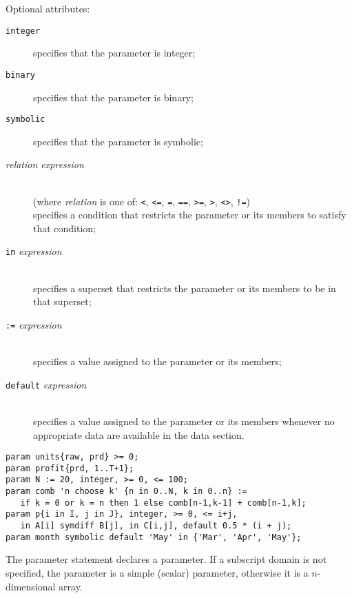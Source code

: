 \documentclass[10pt]{article}
\begin{document}
\noindent Optional attributes:

\begin{description}
\item[{\tt integer}\hspace*{18.5pt}] specifies that the parameter is
integer;
\item[{\tt binary}\hspace*{24pt}] specifies that the parameter is
binary;
\item[{\tt symbolic}\hspace*{13.5pt}] specifies that the parameter is
symbolic;
\item[{\it relation expression}]\hspace*{0pt}\\
(where {\it relation} is one of: {\tt<}, {\tt<=}, {\tt=}, {\tt==},
{\tt>=}, {\tt>}, {\tt<>}, {\tt!=})\\
specifies a condition that restricts the parameter or its members to
satisfy that condition;
\item[{\tt in} {\it expression}]\hspace*{0pt}\\
specifies a superset that restricts the parameter or its members to be
in that superset;
\item[{\tt:=} {\it expression}]\hspace*{0pt}\\
specifies a value assigned to the parameter or its members;
\item[{\tt default} {\it expression}]\hspace*{0pt}\\
specifies a value assigned to the parameter or its members whenever
no appropriate data are available in the data section.
\end{description}


\begin{verbatim}
param units{raw, prd} >= 0;
param profit{prd, 1..T+1};
param N := 20, integer, >= 0, <= 100;
param comb 'n choose k' {n in 0..N, k in 0..n} :=
   if k = 0 or k = n then 1 else comb[n-1,k-1] + comb[n-1,k];
param p{i in I, j in J}, integer, >= 0, <= i+j,
   in A[i] symdiff B[j], in C[i,j], default 0.5 * (i + j);
param month symbolic default 'May' in {'Mar', 'Apr', 'May'};
\end{verbatim}

The parameter statement declares a parameter. If a subscript domain is
not specified, the parameter is a simple (scalar) parameter, otherwise
it is a $n$-dimensional array.
\end{document}
